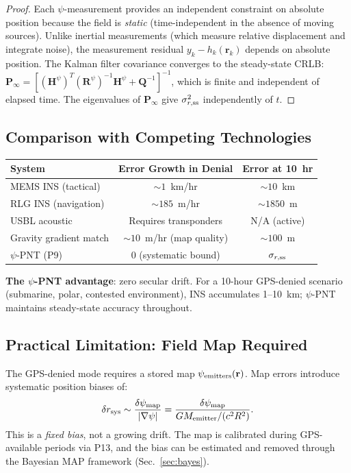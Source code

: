 \documentclass[aps,prd,twocolumn,superscriptaddress,nofootinbib]{revtex4-2}
\begin{document}
\begin{proof}
Each $\psi$-measurement provides an independent constraint on absolute
position because the field is \emph{static} (time-independent in the
absence of moving sources).  Unlike inertial measurements (which measure
relative displacement and integrate noise), the measurement residual
$y_k - h_k(\mathbf{r}_k)$ depends on absolute position.  The Kalman
filter covariance converges to the steady-state CRLB:
$\mathbf{P}_\infty = [(\mathbf{H}^\psi)^T(\mathbf{R}^\psi)^{-1}\mathbf{H}^\psi
+ \mathbf{Q}^{-1}]^{-1}$, which is finite and independent of elapsed time.
The eigenvalues of $\mathbf{P}_\infty$ give $\sigma_{r,\rm ss}^2$
independently of $t$.
\end{proof}

\subsection{Comparison with Competing Technologies}

\begin{center}
\begin{tabular}{lcc}
\toprule
System & Error Growth in Denial & Error at 10~hr \\
\midrule
MEMS INS (tactical) & $\sim 1$~km/hr & $\sim 10$~km \\
RLG INS (navigation) & $\sim 185$~m/hr & $\sim 1850$~m \\
USBL acoustic & Requires transponders & N/A (active) \\
Gravity gradient match & $\sim 10$~m/hr (map quality) & $\sim 100$~m \\
$\psi$-PNT (P9) & $0$ (systematic bound) & $\sigma_{r,\rm ss}$ \\
\bottomrule
\end{tabular}
\end{center}

\textbf{The $\psi$-PNT advantage}: zero secular drift.  For a 10-hour
GPS-denied scenario (submarine, polar, contested environment), INS
accumulates 1--10~km; $\psi$-PNT maintains steady-state accuracy
throughout.

\subsection{Practical Limitation: Field Map Required}

The GPS-denied mode requires a stored map $\psi_{\rm emitters}(\mathbf{r})$.
Map errors introduce systematic position biases of:
\begin{equation}
\delta r_{\rm sys} \sim \frac{\delta\psi_{\rm map}}{|\nabla\psi|}
= \frac{\delta\psi_{\rm map}}{GM_{\rm emitter}/(c^2 R^2)}.
\end{equation}
This is a \emph{fixed bias}, not a growing drift.  The map is calibrated
during GPS-available periods via P13, and the bias can be estimated and
removed through the Bayesian MAP framework (Sec.~\ref{sec:bayes}).
\end{document}
